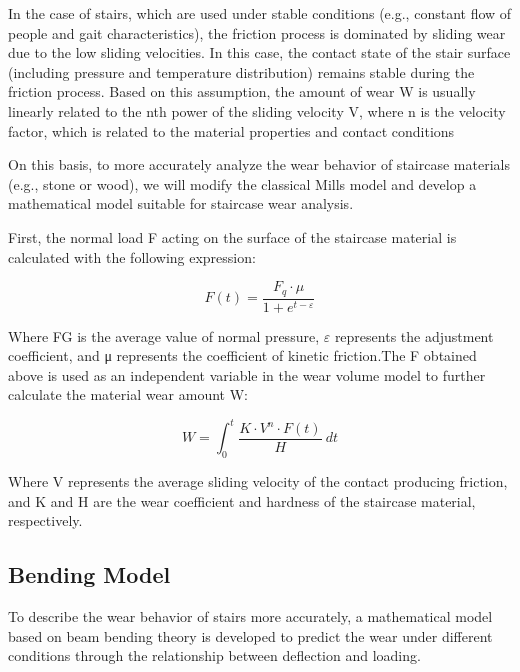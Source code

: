 \documentclass{mcmthesis}
\begin{document}
In the case of stairs, which are used under stable conditions (e.g., constant flow of people and gait characteristics), the friction process is dominated by sliding wear due to the low sliding velocities. In this case, the contact state of the stair surface (including pressure and temperature distribution) remains stable during the friction process. Based on this assumption, the amount of wear W is usually linearly related to the nth power of the sliding velocity V, where n is the velocity factor, which is related to the material properties and contact conditions%

On this basis, to more accurately analyze the wear behavior of staircase materials (e.g., stone or wood), we will modify the classical Mills model and develop a mathematical model suitable for staircase wear analysis.

First, the normal load F acting on the surface of the staircase material is calculated with the following expression:

\[ F(t) = \frac{F_{q} \cdot \mu}{1 + e^{t - \varepsilon }} \]

Where FG is the average value of normal pressure, $\varepsilon$  represents the adjustment coefficient, and μ represents the coefficient of kinetic friction.The F obtained above is used as an independent variable in the wear volume model to further calculate the material wear amount W:


\[ W = \int_{0}^{t} \frac{K \cdot V^{n} \cdot F(t)}{H} \ dt \]

Where V represents the average sliding velocity of the contact producing friction, and K and H are the wear coefficient and hardness of the staircase material, respectively.
\subsection{Bending Model}
To describe the wear behavior of stairs more accurately, a mathematical model based on beam bending theory is developed to predict the wear under different conditions through the relationship between deflection and loading.
\end{document}
